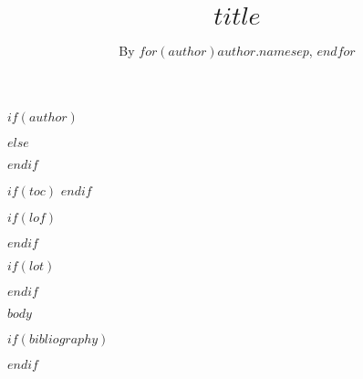 \title{$title$}

$if(author)$
\author{By $for(author)$$author.name$$sep$, $endfor$}
$else$
\author{}
$endif$

\maketitle

$if(toc)$
\setcounter{tocdepth}{$toc-depth$}
\tableofcontents
\clearpage
$endif$

$if(lof)$
\renewcommand*\listfigurename{Figures}
\listoffigures
\clearpage
$endif$

$if(lot)$
\renewcommand*\listtablename{Tables}
\listoftables
\clearpage
$endif$

\RaggedRight

$body$

$if(bibliography)$
\clearpage
{}
{}
\printbibliography
$endif$

